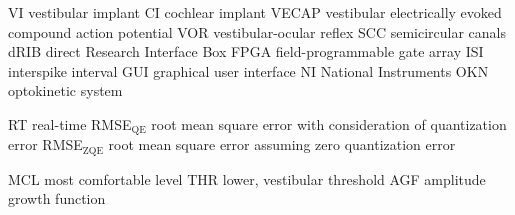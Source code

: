 VI vestibular implant
CI cochlear implant
VECAP vestibular electrically evoked compound action potential
VOR vestibular-ocular reflex
SCC semicircular canals
dRIB direct Research Interface Box
FPGA field-programmable gate array
ISI interspike interval
GUI graphical user interface
NI National Instruments
OKN optokinetic system

RT real-time
RMSE$_{\text{QE}}$ root mean square error with consideration of quantization error
RMSE$_{\text{ZQE}}$ root mean square error assuming zero quantization error

MCL most comfortable level
THR lower, vestibular threshold
AGF amplitude growth function